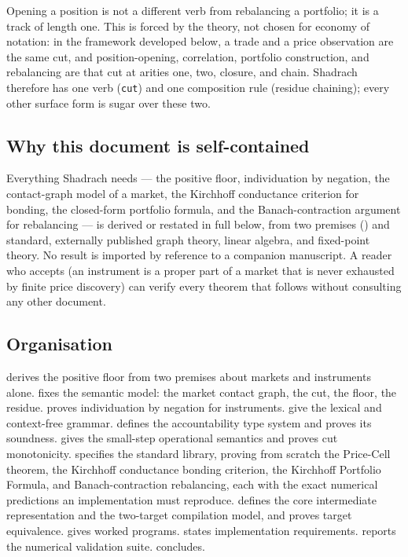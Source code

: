\documentclass[11pt,a4paper]{article}
\theoremstyle{thmstyle}
\theoremstyle{definition}
\theoremstyle{remark}
\newcommand{\sh}[1]{\texttt{#1}}
\begin{document}
Opening a position is not a different verb from rebalancing a
portfolio; it is a track of length one. This is forced by the theory,
not chosen for economy of notation: in the framework developed below, a
trade and a price observation are the same cut, and position-opening,
correlation, portfolio construction, and rebalancing are that cut at
arities one, two, closure, and chain. Shadrach therefore has one verb
(\sh{cut}) and one composition rule (residue chaining); every other
surface form is sugar over these two.

\subsection{Why this document is self-contained}

Everything Shadrach needs --- the positive floor, individuation by
negation, the contact-graph model of a market, the Kirchhoff conductance
criterion for bonding, the closed-form portfolio formula, and the
Banach-contraction argument for rebalancing --- is derived or restated
in full below, from two premises () and standard,
externally published graph theory, linear algebra, and fixed-point
theory. No result is imported by reference to a companion manuscript. A
reader who accepts  (an instrument is
a proper part of a market that is never exhausted by finite price
discovery) can verify every theorem that follows without consulting any
other document.

\subsection{Organisation}

 derives the positive floor from two premises about
markets and instruments alone.  fixes the semantic
model: the market contact graph, the cut, the floor, the residue.
 proves individuation by negation for instruments.
 give the lexical and context-free
grammar.  defines the accountability type system and
proves its soundness.  gives the small-step operational
semantics and proves cut monotonicity.  specifies the
standard library, proving from scratch the Price-Cell theorem, the
Kirchhoff conductance bonding criterion, the Kirchhoff Portfolio
Formula, and Banach-contraction rebalancing, each with the exact
numerical predictions an implementation must reproduce.
 defines the core intermediate representation and the
two-target compilation model, and proves target equivalence.
 gives worked programs.  states
implementation requirements.  reports the
numerical validation suite.  concludes.
\end{document}

